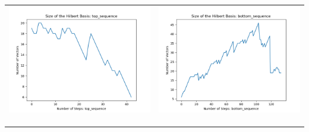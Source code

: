 \documentclass[10pt]{article}
\begin{document}
\begin{tabular}{c|c}
\begin{minipage}{.45\textwidth}
\includegraphics[width=\textwidth]{"DATA/4d/5 generators 2 bound G/top_sequence SIZE"}
\end{minipage} &
\begin{minipage}{.45\textwidth}
\includegraphics[width=\textwidth]{"DATA/4d/5 generators 2 bound G bottomup/bottom_sequence SIZE"}
\end{minipage} \\ \\
\hline \\\begin{minipage}{.45\textwidth}

\end{minipage}
\end{tabular}
\end{document}
